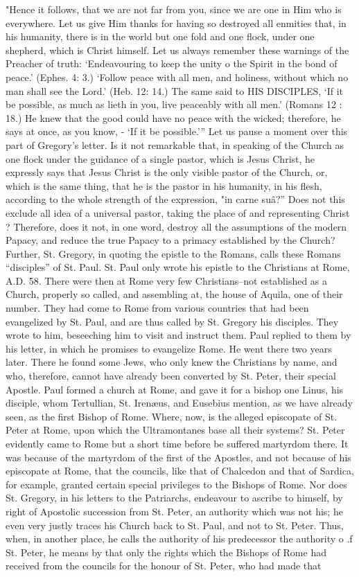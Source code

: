 "Hence it follows, that we are not far from you, since we are one in Him who is everywhere. Let us give Him thanks for having so destroyed all enmities that, in his humanity, there is in the world but one fold and one flock, under one shepherd, which is Christ himself. Let us always remember these warnings of the Preacher of truth: ‘Endeavouring to keep the unity o the Spirit in the bond of peace.' (Ephes. 4: 3.) ‘Follow peace with all men, and holiness, without which no man shall see the Lord.' (Heb. 12: 14.) The same said to HIS DISCIPLES, ‘If it be possible, as much as lieth in you, live peaceably with all men.' (Romans 12 : 18.) He knew that the good could have no peace with the wicked; therefore, he says at once, as you know, - ‘If it be possible.’” Let us pause a moment over this part of Gregory's letter. Is it not remarkable that, in speaking of the Church as one flock under the guidance of a single pastor, which is Jesus Christ, he expressly says that Jesus Christ is the only visible pastor of the Church, or, which is the same thing, that he is the pastor in his humanity, in his flesh, according to the whole strength of the expression, "in carne suâ?” Does not this exclude all idea of a universal pastor, taking the place of and representing Christ ? Therefore, does it not, in one word, destroy all the assumptions of the modern Papacy, and reduce the true Papacy to a primacy established by the Church? Further, St. Gregory, in quoting the epistle to the Romans, calls these Romans “disciples” of St. Paul. St. Paul only wrote his epistle to the Christians at Rome, A.D. 58. There were then at Rome very few Christians--not established as a Church, properly so called, and assembling at, the house of Aquila, one of their number. They had come to Rome from various countries that had been evangelized by St. Paul, and are thus called by St. Gregory his disciples. They wrote to him, beseeching him to visit and instruct them. Paul replied to them by his letter, in which he promises to evangelize Rome. He went there two years later. There he found some Jews, who only knew the Christians by name, and who, therefore, cannot have already been converted by St. Peter, their special Apostle. Paul formed a church at Rome, and gave it for a bishop one Linus, his disciple, whom Tertullian, St. Irenæus, and Eusebius mention, as we have already seen, as the first Bishop of Rome. Where, now, is the alleged episcopate of St. Peter at Rome, upon which the Ultramontanes base all their systems? St. Peter evidently came to Rome but a short time before be suffered martyrdom there. It was because of the martyrdom of the first of the Apostles, and not because of his episcopate at Rome, that the councils, like that of Chalcedon and that of Sardica, for example, granted certain special privileges to the Bishops of Rome. Nor does St. Gregory, in his letters to the Patriarchs, endeavour to ascribe to himself, by right of Apostolic succession from St. Peter, an authority which was not his; he even very justly traces his Church back to St. Paul, and not to St. Peter. Thus, when, in another place, he calls the authority of his predecessor the authority o .f St. Peter, he means by that only the rights which the Bishops of Rome had received from the councils for the honour of St. Peter, who had made that 